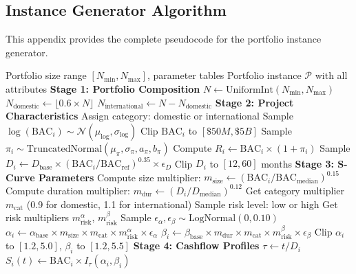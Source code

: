 \subsection{Instance Generator Algorithm}

This appendix provides the complete pseudocode for the portfolio instance generator.

\begin{algorithm}[H]
\caption{Portfolio Instance Generator}
\label{alg:instance_generator}
\begin{algorithmic}[1]
\Require Portfolio size range $[N_{\min}, N_{\max}]$, parameter tables
\Ensure Portfolio instance $\mathcal{P}$ with all attributes
\State
\State \textbf{Stage 1: Portfolio Composition}
\State $N \gets \text{UniformInt}(N_{\min}, N_{\max})$
\State $N_{\text{domestic}} \gets \lfloor 0.6 \times N \rfloor$
\State $N_{\text{international}} \gets N - N_{\text{domestic}}$
\State
\State \textbf{Stage 2: Project Characteristics}
    \State Assign category: domestic or international
    \State Sample $\log(\text{BAC}_i) \sim \mathcal{N}(\mu_{\log}, \sigma_{\log})$
    \State Clip $\text{BAC}_i$ to $[\$50M, \$5B]$
    \State Sample $\pi_i \sim \text{TruncatedNormal}(\mu_\pi, \sigma_\pi, a_\pi, b_\pi)$
    \State Compute $R_i \gets \text{BAC}_i \times (1 + \pi_i)$
    \State Sample $D_i \gets D_{\text{base}} \times (\text{BAC}_i / \text{BAC}_{\text{ref}})^{0.35} \times \epsilon_D$
    \State Clip $D_i$ to $[12, 60]$ months
\EndFor
\State
\State \textbf{Stage 3: S-Curve Parameters}
    \State Compute size multiplier: $m_{\text{size}} \gets (\text{BAC}_i / \text{BAC}_{\text{median}})^{0.15}$
    \State Compute duration multiplier: $m_{\text{dur}} \gets (D_i / D_{\text{median}})^{0.12}$
    \State Get category multiplier $m_{\text{cat}}$ (0.9 for domestic, 1.1 for international)
    \State Sample risk level: low or high
    \State Get risk multipliers $m_{\text{risk}}^\alpha$, $m_{\text{risk}}^\beta$
    \State Sample $\epsilon_\alpha, \epsilon_\beta \sim \text{LogNormal}(0, 0.10)$
    \State $\alpha_i \gets \alpha_{\text{base}} \times m_{\text{size}} \times m_{\text{cat}} \times m_{\text{risk}}^\alpha \times \epsilon_\alpha$
    \State $\beta_i \gets \beta_{\text{base}} \times m_{\text{dur}} \times m_{\text{cat}} \times m_{\text{risk}}^\beta \times \epsilon_\beta$
    \State Clip $\alpha_i$ to $[1.2, 5.0]$, $\beta_i$ to $[1.2, 5.5]$
\EndFor
\State
\State \textbf{Stage 4: Cashflow Profiles}
        \State $\tau \gets t / D_i$
        \State $S_i(t) \gets \text{BAC}_i \times I_\tau(\alpha_i, \beta_i)$ 

\end{algorithmic}
\end{algorithm}
